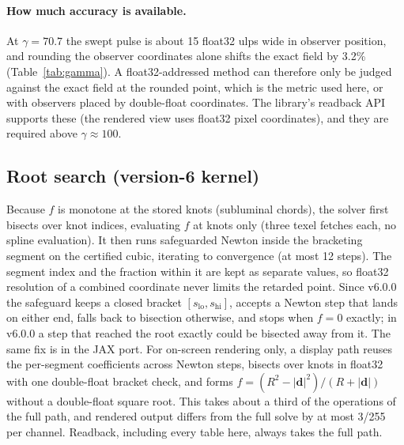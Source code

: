 \documentclass[11pt, a4paper]{article}
\begin{document}
\paragraph{How much accuracy is available.} At $\gamma = 70.7$ the swept pulse is about 15 float32 ulps wide in observer position, and rounding the observer coordinates alone shifts the exact field by 3.2\% (Table~\ref{tab:gamma}). A float32-addressed method can therefore only be judged against the exact field at the rounded point, which is the metric used here, or with observers placed by double-float coordinates. The library's readback API supports these (the rendered view uses float32 pixel coordinates), and they are required above $\gamma \approx 100$.

\subsection{Root search (version-6 kernel)}\label{sec:root}
Because $f$ is monotone at the stored knots (subluminal chords), the solver first bisects over knot indices, evaluating $f$ at knots only (three texel fetches each, no spline evaluation). It then runs safeguarded Newton inside the bracketing segment on the certified cubic, iterating to convergence (at most 12 steps). The segment index and the fraction within it are kept as separate values, so float32 resolution of a combined coordinate never limits the retarded point. Since v6.0.0 the safeguard keeps a closed bracket $[s_{\text{lo}}, s_{\text{hi}}]$, accepts a Newton step that lands on either end, falls back to bisection otherwise, and stops when $f = 0$ exactly; in v6.0.0 a step that reached the root exactly could be bisected away from it. The same fix is in the JAX port. For on-screen rendering only, a display path reuses the per-segment coefficients across Newton steps, bisects over knots in float32 with one double-float bracket check, and forms $f = (R^2 - |\mathbf{d}|^2)/(R + |\mathbf{d}|)$ without a double-float square root. This takes about a third of the operations of the full path, and rendered output differs from the full solve by at most 3/255 per channel. Readback, including every table here, always takes the full path.
\end{document}
